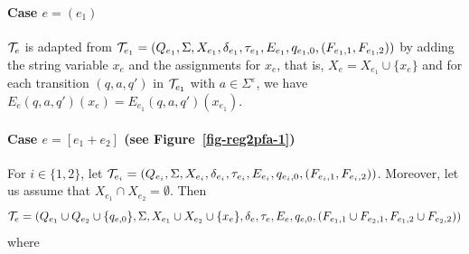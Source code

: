 		
\paragraph{Case $e = (e_1)$} $\mathcal{T}_e$ is adapted from $\mathcal{T}_{e_1} = (Q_{e_1}, \Sigma, X_{e_1}, \delta_{e_1}, \tau_{e_1}, E_{e_1},  q_{e_1,0}, (F_{e_1,1}, F_{e_1,2}))$ by adding the string variable $x_e$ and the assignments for $x_e$, that is, $X_e = X_{e_1} \cup \{x_e\}$ and for each transition $(q, a, q')$ in $\mathcal{T}_{e_1} $ with $a \in \Sigma^\varepsilon$, we have $E_e(q, a, q')(x_e) = E_{e_1}(q, a, q')(x_{e_1})$. 
		

\paragraph{Case $e = [e_1 + e_2]$ (see Figure~\ref{fig-reg2pfa-1})} For $i \in \{1, 2\}$, let  
$\mathcal{T}_{e_i} = (Q_{e_i}, \Sigma, X_{e_i}, \delta_{e_i}, \tau_{e_i}, E_{e_i},  q_{e_i,0}, (F_{e_i,1}, F_{e_i,2}))$. Moreover, let us assume that $X_{e_1} \cap X_{e_2} = \emptyset$.
% 
Then 
\[\mathcal{T}_e = (Q_{e_1} \cup Q_{e_2} \cup \{q_{e,0}\}, \Sigma, X_{e_1} \cup X_{e_2} \cup \{x_e\}, 
		\delta_e, \tau_e, E_e, q_{e,0}, (F_{e_1,1} \cup F_{e_2,1}, F_{e_1,2} \cup F_{e_2,2}))\] where  
